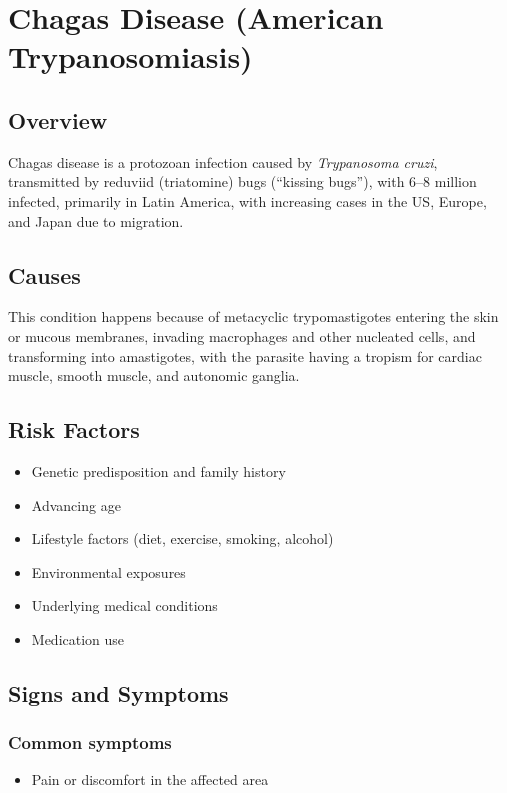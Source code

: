 \chapter{Chagas Disease (American Trypanosomiasis)}
\label{sec:Chagas Disease}

\section{Overview}
Chagas disease is a protozoan infection caused by \textit{Trypanosoma cruzi}, transmitted by reduviid (triatomine) bugs (``kissing bugs''), with 6--8 million infected, primarily in Latin America, with increasing cases in the US, Europe, and Japan due to migration.
\section{Causes}
This condition happens because of metacyclic trypomastigotes entering the skin or mucous membranes, invading macrophages and other nucleated cells, and transforming into amastigotes, with the parasite having a tropism for cardiac muscle, smooth muscle, and autonomic ganglia.     
\section{Risk Factors}

\begin{itemize}[noitemsep]
  \item Genetic predisposition and family history
  \item Advancing age
  \item Lifestyle factors (diet, exercise, smoking, alcohol)
  \item Environmental exposures
  \item Underlying medical conditions
  \item Medication use
\end{itemize}
\section{Signs and Symptoms}

\subsection{Common symptoms}
\begin{itemize}[noitemsep]
  \item Pain or discomfort in the affected area
  \end{itemize}

